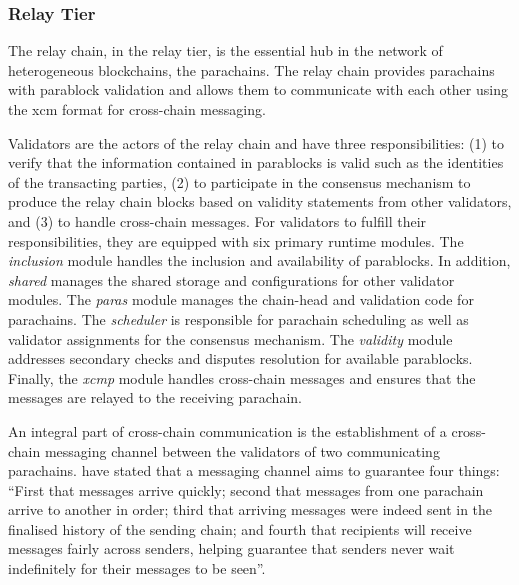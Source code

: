 \documentclass[conference]{IEEEtran}
\begin{document}
\subsubsection{Relay Tier} \label{s:relay_tier}
The relay chain, in the relay tier, is the essential hub in the network of heterogeneous blockchains, the parachains. The relay chain provides parachains with parablock validation and allows them to communicate with each other using the \ac{xcm} format for cross-chain messaging.

Validators are the actors of the relay chain and have three responsibilities: (1) to verify that the information contained in parablocks is valid such as the identities of the transacting parties, (2) to participate in the consensus mechanism to produce the relay chain blocks based on validity statements from other validators, and (3) to handle cross-chain messages. For validators to fulfill their responsibilities, they are equipped with six primary runtime modules. The \textit{inclusion} module handles the inclusion and availability of parablocks. In addition, \textit{shared} manages the shared storage and configurations for other validator modules. The \textit{paras} module manages the chain-head and validation code for parachains. The \textit{scheduler} is responsible for parachain scheduling as well as validator assignments for the consensus mechanism. The \textit{validity} module addresses secondary checks and disputes resolution for available parablocks. Finally, the \textit{\ac{xcmp}} module handles cross-chain messages and ensures that the messages are relayed to the receiving parachain. 

An integral part of cross-chain communication is the establishment of a cross-chain messaging channel between the validators of two communicating parachains. \citeauthor{burdges2020overview} \cite{burdges2020overview} have stated that a messaging channel aims to guarantee four things: ``First that messages arrive quickly; second that messages from one parachain arrive to another in order; third that arriving messages were indeed sent in the finalised history of the sending chain; and fourth that recipients will receive messages fairly across senders, helping guarantee that senders never wait indefinitely for their messages to be seen''.  
\end{document}

